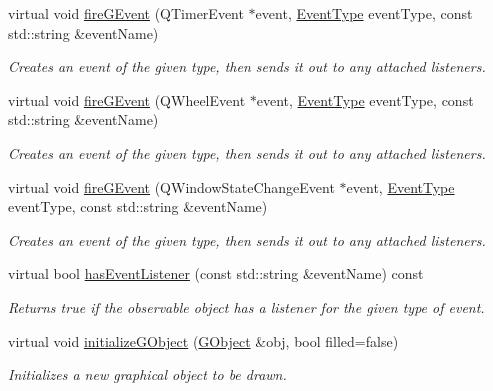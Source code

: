 \begin{DoxyCompactItemize}
virtual void \mbox{\hyperlink{classsgl_1_1GObservable_a741345310d9b7c5170a6cbc410c44ac4}{fire\+G\+Event}} (Q\+Timer\+Event $\ast$event, \mbox{\hyperlink{namespacesgl_a2628ea8d12e8b2563c32f05dc7fff6fa}{Event\+Type}} event\+Type, const std\+::string \&event\+Name)
\begin{DoxyCompactList}\small\item\em Creates an event of the given type, then sends it out to any attached listeners. \end{DoxyCompactList}\item 
virtual void \mbox{\hyperlink{classsgl_1_1GObservable_a93bf338968a0338761b8e4dc62f582e9}{fire\+G\+Event}} (Q\+Wheel\+Event $\ast$event, \mbox{\hyperlink{namespacesgl_a2628ea8d12e8b2563c32f05dc7fff6fa}{Event\+Type}} event\+Type, const std\+::string \&event\+Name)
\begin{DoxyCompactList}\small\item\em Creates an event of the given type, then sends it out to any attached listeners. \end{DoxyCompactList}\item 
virtual void \mbox{\hyperlink{classsgl_1_1GObservable_a2a70a7d7435ff0c3b80bb4d70da19e0d}{fire\+G\+Event}} (Q\+Window\+State\+Change\+Event $\ast$event, \mbox{\hyperlink{namespacesgl_a2628ea8d12e8b2563c32f05dc7fff6fa}{Event\+Type}} event\+Type, const std\+::string \&event\+Name)
\begin{DoxyCompactList}\small\item\em Creates an event of the given type, then sends it out to any attached listeners. \end{DoxyCompactList}\item 
virtual bool \mbox{\hyperlink{classsgl_1_1GObservable_a9f6faaa25942923bafa1c44020c49fa9}{has\+Event\+Listener}} (const std\+::string \&event\+Name) const
\begin{DoxyCompactList}\small\item\em Returns true if the observable object has a listener for the given type of event. \end{DoxyCompactList}\item 
virtual void \mbox{\hyperlink{classsgl_1_1GDrawingSurface_a814498efebc5586645159cd22990cf61}{initialize\+G\+Object}} (\mbox{\hyperlink{classsgl_1_1GObject}{G\+Object}} \&obj, bool filled=false)
\begin{DoxyCompactList}\small\item\em Initializes a new graphical object to be drawn. \end{DoxyCompactList}\item 

\end{DoxyCompactItemize}
